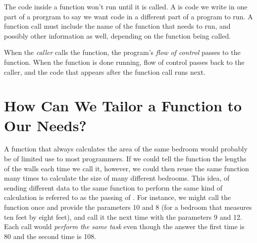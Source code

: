 The code inside a function won't run until it is called.  A  is code we write in one part of a prorgram to say we want code in a different part of a program to run.  A function call must include the name of the function that needs to run, and possibly other information as well, depending on the function being called.

When the \textit{caller} calls the function, the program's \textit{flow of control} passes to the function.  When the function is done running, flow of control passes back to the caller, and the code that appears after the function call runs next.

\section{How Can We Tailor a Function to Our Needs?}

A function that always calculates the area of the same bedroom would probably be of limited use to most programmers.  If we could tell the function the lengths of the walls each time we call it, however, we could then reuse the same function many times to calculate the size of many different bedrooms.  This idea, of sending different data to the same function to perform the same kind of calculation is referred to as the passing of .  For instance, we might call the function once and provide the parameters 10 and 8 (for a bedroom that measures ten feet by eight feet), and call it the next time with the parameters 9 and 12.  Each call would \textit{perform the same task} even though the answer the first time is 80 and the second time is 108.